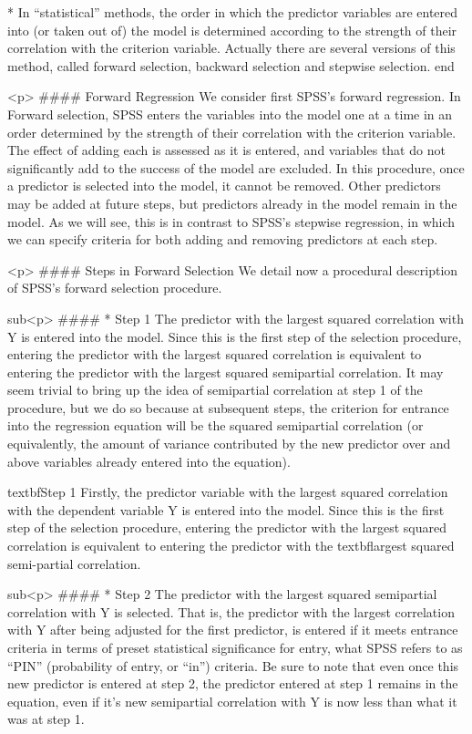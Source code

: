          * In “statistical” methods, the order in which the predictor variables are entered into (or taken out of) the model is determined according to the strength of their correlation with the criterion variable. Actually there are several versions of this method, called forward selection, backward selection and stepwise selection.
end{ }


<p>
#### {Forward Regression}
We consider first SPSS’s forward regression. In Forward selection, SPSS enters the variables into the model one at a time in an
order determined by the strength of their correlation with the criterion variable. The effect of adding each is assessed as it is entered, and variables that do not significantly add to the success of the model are excluded. In this procedure, once a predictor is selected into the model, it cannot be removed. Other predictors may be added at future steps, but predictors already in the model remain in the model. As we will see, this is in contrast to SPSS’s stepwise regression, in which we can specify criteria for both adding and removing predictors at each step.

<p>
#### {Steps in Forward Selection}
We detail now a procedural description of SPSS’s forward selection procedure.

sub<p>
####        * {Step 1}
The predictor with the largest squared correlation with Y is entered into the model. Since this is the first step of the selection procedure, entering the predictor with the largest squared correlation is equivalent to entering the predictor with the largest squared semipartial correlation. It may seem trivial to bring up the idea of semipartial correlation at step 1 of the procedure, but we do so because at subsequent steps, the criterion for entrance into the regression equation will be the squared semipartial correlation (or equivalently, the amount of variance contributed by the new predictor over and above variables already entered into the equation).

textbf{Step 1}
Firstly, the predictor variable with the largest squared correlation with the dependent variable Y is entered into the model. Since this is the first step of the selection procedure, entering the predictor with the largest squared correlation is equivalent to entering the predictor with the textbf{largest squared semi-partial} correlation. 





sub<p>
####        * {Step 2}
The predictor with the largest squared semipartial correlation with Y is selected. That is, the predictor with the largest correlation with Y after being adjusted for the first predictor, is entered if it meets entrance criteria in terms of preset statistical significance for entry, what SPSS refers to as “PIN” (probability of entry, or “in”) criteria. Be sure to note that even once this new predictor is entered at step 2, the predictor entered at step 1 remains in the equation, even if it’s new semipartial correlation with Y is now less than what it was at step 1. 

